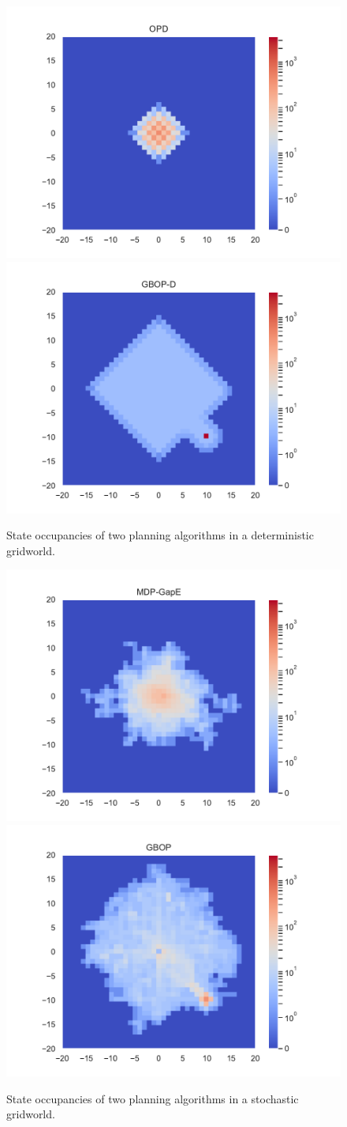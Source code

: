\documentclass[runningheads]{llncs}
\begin{document}
\begin{figure}[ht]
	\centering
	\includegraphics[trim={1.8cm 0.7cm 1.8cm 0.7cm}, clip, width=0.49\linewidth]{img/occupations_OPD.pdf}
	\hfill
	\includegraphics[trim={1.8cm 0.7cm 1.8cm 0.7cm}, clip, width=0.49\linewidth]{img/occupations_GBOP-D.pdf}
	\caption{State occupancies of two planning algorithms in a deterministic gridworld.}
	\label{fig:deterministic-gridworld}
\end{figure}
\begin{figure}[ht]
	\centering
	\includegraphics[trim={1.8cm 0.7cm 1.8cm 0.7cm}, clip, width=0.49\linewidth]{img/occupations_MDP-GapE.pdf}
	\hfill
	\includegraphics[trim={1.8cm 0.7cm 1.8cm 0.7cm}, clip, width=0.49\linewidth]{img/occupations_GBOP.pdf}
	\caption{State occupancies of two planning algorithms in a stochastic gridworld.}
	\label{fig:stochastic-gridworld}
\end{figure}
\end{document}
